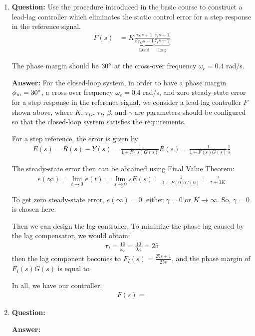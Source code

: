 \documentclass[a4paper,11pt]{article}
\begin{document}
\begin{enumerate}
	\item \textbf{Question:} Use the procedure introduced in the basic course to construct a lead-lag controller which eliminates the static control error for a step response in the reference signal.
	\begin{align*}
		F(s) &= K\underbrace{\frac{\tau_{D}s+1}{\beta\tau_{D}s+1}}_{\mathrm{Lead}}\underbrace{\frac{\tau_{I}s+1}{\tau_{I}s+\gamma}}_{\mathrm{Lag}}
	\end{align*}
	\par The phase margin should be $30\degree$ at the cross-over frequency $\omega_{c}=0.4$ rad/s.
	\par \textbf{Answer:} For the closed-loop system, in order to have a phase margin $\phi_{m}=30\degree$, a cross-over frequency $\omega_{c}=0.4$ rad/s, and zero steady-state error for a step response in the reference signal, we consider a lead-lag controller $F$ shown above, where $K$, $\tau_{D}$, $\tau_{I}$, $\beta$, and $\gamma$ are parameters should be configured so that the closed-loop system satisfies the requirements.
	\par For a step reference, the error is given by
	\begin{align*}
		E(s) = R(s) - Y(s) = \frac{1}{1+F(s)G(s)}R(s) = \frac{1}{1+F(s)G(s)}\frac{1}{s}
	\end{align*}
	\par The steady-state error then can be obtained using Final Value Theorem:
	\begin{align*}
		e(\infty) = \lim_{t\rightarrow 0}e(t) = \lim_{s\rightarrow 0} sE(s) = \frac{1}{1+F(0)G(0)} = \frac{\gamma}{\gamma + 3K}
	\end{align*}
	\par To get zero steady-state error, $e(\infty) = 0$, either $\gamma = 0$ or $K \rightarrow \infty$. So, $\gamma = 0$ is chosen here.
	\par Then we can design the lag controller. To minimize the phase lag caused by the lag compensator, we would obtain:
	\begin{align*}
		\tau_{I} = \frac{10}{\omega_{c}} = \frac{10}{0.4} = 25
	\end{align*}
	then the lag component becomes to $F_{I}(s) = \frac{25s+1}{25s}$, and the phase margin of $F_{I}(s)G(s)$ is equal to 
	
	\par In all, we have our controller:
	\begin{align*}
		F(s) = 
	\end{align*}
	
	\item \textbf{Question:} 
	\par \textbf{Answer:} 


\end{enumerate}
\end{document}
